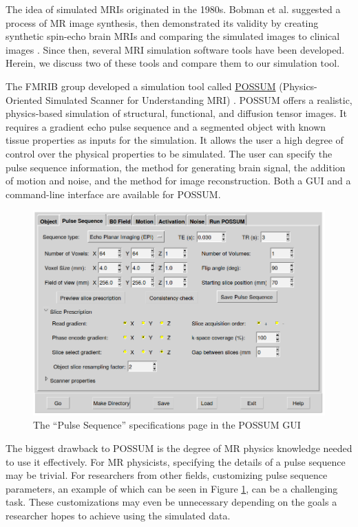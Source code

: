The idea of simulated MRIs originated in the 1980s. Bobman et al. suggested a process of MR image synthesis, then demonstrated its validity by creating synthetic spin-echo brain MRIs and comparing the simulated images to clinical images \cite{Bobman1985}. Since then, several MRI simulation software tools have been developed. Herein, we discuss two of these tools and compare them to our simulation tool.

The FMRIB group developed a simulation tool called \href{https://fsl.fmrib.ox.ac.uk/fsl/fslwiki/POSSUM}{POSSUM} (Physics-Oriented Simulated Scanner for Understanding MRI) \cite{Drobnjak2006} \cite{Drobnjak2010}. POSSUM offers a realistic, physics-based simulation of structural, functional, and diffusion tensor images. It requires a gradient echo pulse sequence and a segmented object with known tissue properties as inputs for the simulation. It allows the user a high degree of control over the physical properties to be simulated. The user can specify the pulse sequence information, the method for generating brain signal, the addition of motion and noise, and the method for image reconstruction. Both a GUI and a command-line interface are available for POSSUM. 

\begin{figure}
\centering
\includegraphics[width=.6\textwidth]{7/possum-gui.png}
\caption{The ``Pulse Sequence'' specifications page in the POSSUM GUI}
\label{fig:possum}
\end{figure}

The biggest drawback to POSSUM is the degree of MR physics knowledge needed to use it effectively. For MR physicists, specifying the details of a pulse sequence may be trivial. For researchers from other fields, customizing pulse sequence parameters, an example of which can be seen in Figure \ref{fig:possum}, can be a challenging task. These customizations may even be unnecessary depending on the goals a researcher hopes to achieve using the simulated data.

